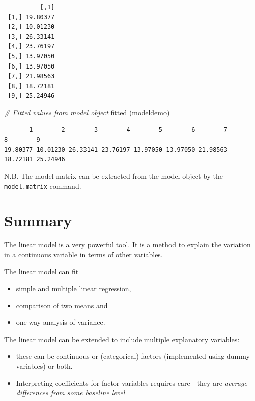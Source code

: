 \documentclass[
  oneside]{krantz}
\newenvironment{Shaded}{\begin{snugshade}}{\end{snugshade}}
\newcommand{\CommentTok}[1]{\textcolor[rgb]{0.56,0.35,0.01}{\textit{#1}}}
\newcommand{\FunctionTok}[1]{\textcolor[rgb]{0.00,0.00,0.00}{#1}}
\newcommand{\NormalTok}[1]{#1}
\providecommand{\tightlist}{%
  \setlength{\itemsep}{0pt}\setlength{\parskip}{0pt}}
\begin{document}
\begin{verbatim}
          [,1]
 [1,] 19.80377
 [2,] 10.01230
 [3,] 26.33141
 [4,] 23.76197
 [5,] 13.97050
 [6,] 13.97050
 [7,] 21.98563
 [8,] 18.72181
 [9,] 25.24946
\end{verbatim}

\begin{Shaded}
\begin{Highlighting}[]
\CommentTok{\# Fitted values from model object}
\FunctionTok{fitted}\NormalTok{ (modeldemo)}
\end{Highlighting}
\end{Shaded}

\begin{verbatim}
       1        2        3        4        5        6        7        8        9 
19.80377 10.01230 26.33141 23.76197 13.97050 13.97050 21.98563 18.72181 25.24946 
\end{verbatim}

N.B. The model matrix can be extracted from the model object by the \texttt{model.matrix} command.

\hypertarget{SUMlm}{%
\section{Summary}\label{SUMlm}}

The linear model is a very powerful tool. It is a method to explain the variation in a continuous variable in terms of other variables.

The linear model can fit

\begin{itemize}
\tightlist
\item
  simple and multiple linear regression,
\item
  comparison of two means and
\item
  one way analysis of variance.
\end{itemize}

The linear model can be extended to include multiple explanatory variables:

\begin{itemize}
\tightlist
\item
  these can be continuous or (categorical) factors (implemented using dummy variables) or both.
\item
  Interpreting coefficients for factor variables requires care - they are \emph{average differences from some baseline level}
\end{itemize}
\end{document}
